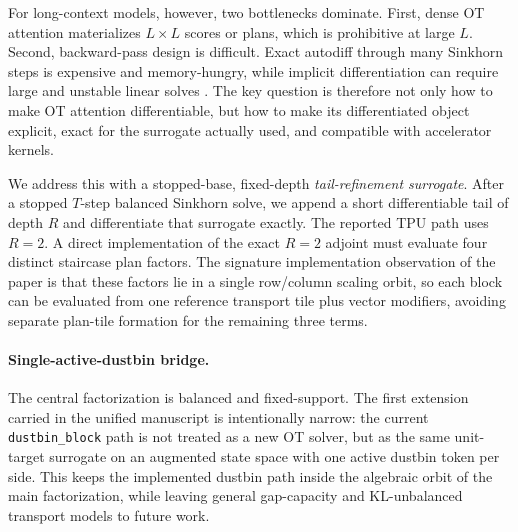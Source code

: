For long-context models, however, two bottlenecks dominate. First, dense OT attention materializes $L\times L$ scores or plans, which is prohibitive at large $L$. Second, backward-pass design is difficult. Exact autodiff through many Sinkhorn steps is expensive and memory-hungry, while implicit differentiation can require large and unstable linear solves \citep{luise2018differential, bai2019deep}. The key question is therefore not only how to make OT attention differentiable, but how to make its differentiated object explicit, exact for the surrogate actually used, and compatible with accelerator kernels.

We address this with a stopped-base, fixed-depth \emph{tail-refinement surrogate}. After a stopped $T$-step balanced Sinkhorn solve, we append a short differentiable tail of depth $R$ and differentiate that surrogate exactly. The reported TPU path uses $R=2$. A direct implementation of the exact $R=2$ adjoint must evaluate four distinct staircase plan factors. The signature implementation observation of the paper is that these factors lie in a single row/column scaling orbit, so each block can be evaluated from one reference transport tile plus vector modifiers, avoiding separate plan-tile formation for the remaining three terms.

\paragraph{Single-active-dustbin bridge.}
The central factorization is balanced and fixed-support. The first extension carried in the unified manuscript is intentionally narrow: the current \texttt{dustbin\_block} path is not treated as a new OT solver, but as the same unit-target surrogate on an augmented state space with one active dustbin token per side. This keeps the implemented dustbin path inside the algebraic orbit of the main factorization, while leaving general gap-capacity and KL-unbalanced transport models to future work.

